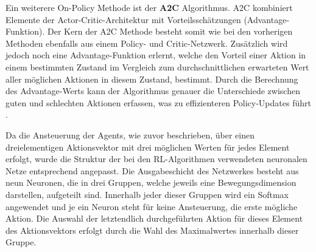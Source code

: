 \documentclass[twocolumn]{webofc}
\begin{document}
Ein weiterere On-Policy Methode ist der \textbf{\ac{A2C}} Algorithmus.
\ac{A2C} kombiniert Elemente der Actor-Critic-Architektur mit Vorteilsschätzungen (Advantage-Funktion). Der Kern der \ac{A2C} Methode besteht somit wie bei den vorherigen Methoden ebenfalls aus einem Policy- und Critic-Netzwerk. Zusätzlich wird jedoch noch eine Advantage-Funktion erlernt, welche den Vorteil einer Aktion in einem bestimmten Zustand im Vergleich zum durchschnittlichen erwarteten Wert aller möglichen Aktionen in diesem Zustand, bestimmt. Durch die Berechnung des Advantage-Werts kann der Algorithmus genauer die Unterschiede zwischen guten und schlechten Aktionen erfassen, was zu effizienteren Policy-Updates führt \cite{MnihBMGLHSK16}.



Da die Ansteuerung der Agents, wie zuvor beschrieben, über einen dreielementigen Aktionsvektor mit drei möglichen Werten für jedes Element erfolgt, wurde die Struktur der bei den \ac{RL}-Algorithmen verwendeten neuronalen Netze entsprechend angepasst. Die Ausgabeschicht des Netzwerkes besteht aus neun Neuronen, die in drei Gruppen, welche jeweils eine Bewegungsdimension darstellen, aufgeteilt sind. Innerhalb jeder dieser Gruppen wird ein Softmax angewendet und je ein Neuron steht für keine Ansteuerung, die erste mögliche Aktion. Die Auswahl der letztendlich durchgeführten Aktion für dieses Element des Aktionsvektors erfolgt durch die Wahl des Maximalwertes innerhalb dieser Gruppe.
\end{document}
